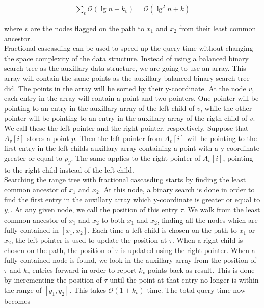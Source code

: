 \begin{align*}
  \sum\limits_{v} \mathcal{O}(\lg n + k_v) = \mathcal{O}(\lg^2 n + k)
\end{align*}

\noindent where $v$ are the nodes flagged on the path to $x_1$ and $x_2$ from their least common ancestor. \\

Fractional cascasding can be used to speed up the query time without changing the space complexity of the data structure. Instead of using a balanced binary search tree as the auxillary data structure, we are going to use an array. This array will contain the same points as the auxillary balanced binary search tree did. The points in the array will be sorted by their y-coordinate. At the node $v$, each entry in the array will contain a point and two pointers. One pointer will be pointing to an entry in the auxillary array of the left child of $v$, while the other pointer will be pointing to an entry in the auxillary array of the rigth child of $v$. We call these the left pointer and the right pointer, respectively. Suppose that $A_v[i]$ stores a point $p$. Then the left pointer from $A_v[i]$ will be pointing to the first entry in the left childs auxillary array containing a point with a y-coordinate greater or equal to $p_y$. The same applies to the right pointer of $A_v[i]$, pointing to the right child instead of the left child. \\

Searching the range tree with fractional cascasding starts by finding the least common ancestor of $x_1$ and $x_2$. At this node, a binary search is done in order to find the first entry in the auxillary array which y-coordinate is greater or equal to $y_1$. At any given node, we call the position of this entry $\tau$. We walk from the least common ancestor of $x_1$ and $x_2$ to both $x_1$ and $x_2$, finding all the nodes which are fully contained in $[x_1, x_2]$. Each time a left child is chosen on the path to $x_1$ or $x_2$, the left pointer is used to update the position at $\tau$. When a right child is chosen on the path, the position of $\tau$ is updated using the right pointer. When a fully contained node is found, we look in the auxillary array from the position of $\tau$ and $k_v$ entries forward in order to report $k_v$ points back as result. This is done by incrementing the position of $\tau$ until the point at that entry no longer is within the range of $[y_1, y_2]$. This takes $\mathcal{O}(1+k_v)$ time. The total query time now becomes

